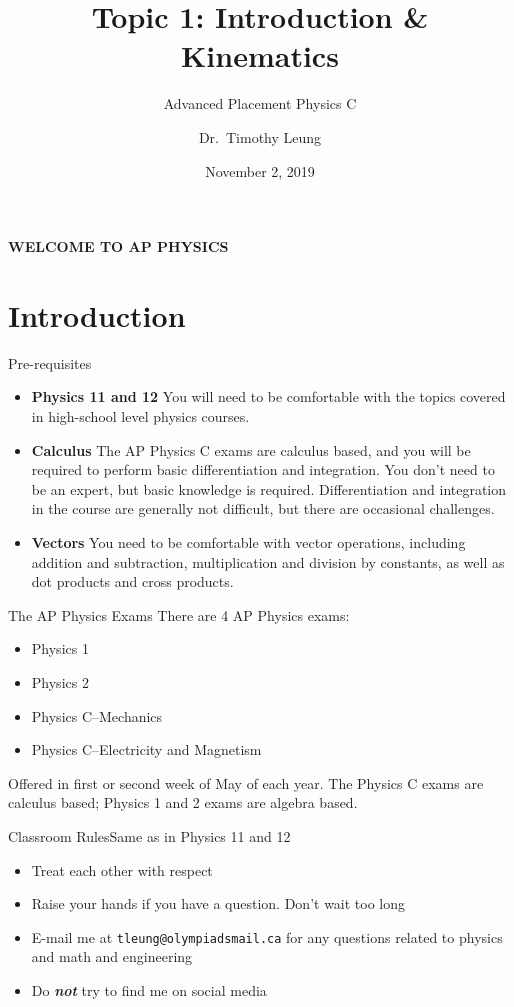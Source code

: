 \documentclass[12pt,compress,aspectratio=169]{beamer}
\title{Topic 1: Introduction \& Kinematics}
\subtitle{Advanced Placement Physics C}
\author[TML]{Dr.\ Timothy Leung}
\institute{Olympiads School}
\date{November 2, 2019}
\begin{document}
\begin{frame}{}

  {\LARGE
    \begin{center}
      \textbf{WELCOME TO AP PHYSICS}
    \end{center}
  }
\end{frame}


\section{Introduction}

\begin{frame}{Pre-requisites}
  \begin{itemize}
  \item\textbf{Physics 11 and 12} You will need to be comfortable with the
    topics covered in high-school level physics courses.
  \item\textbf{Calculus} The AP Physics C exams are calculus based, and you
    will be required to perform basic differentiation and integration. You
    don't need to be an expert, but basic knowledge is required.
    Differentiation and integration in the course are generally not
    difficult, but there are occasional challenges.
  \item\textbf{Vectors} You need to be comfortable with vector operations,
    including addition and subtraction, multiplication and division by
    constants, as well as dot products and cross products.
  \end{itemize}
\end{frame}



\begin{frame}{The AP Physics Exams}
  There are 4 AP Physics exams:
  \begin{itemize}
  \item Physics 1
  \item Physics 2
  \item Physics C--Mechanics
  \item Physics C--Electricity and Magnetism
  \end{itemize}
  Offered in first or second week of May of each year. The Physics C exams
  are calculus based; Physics 1 and 2 exams are algebra based.
\end{frame}



\begin{frame}{Classroom Rules}{Same as in Physics 11 and 12}
  \begin{itemize}
  \item Treat each other with respect
  \item Raise your hands if you have a question. Don't wait too long
  \item E-mail me at \texttt{tleung@olympiadsmail.ca} for any questions related
    to physics and math and engineering
  \item Do \textbf{\emph{not}} try to find me on social media
  \end{itemize}
\end{frame}
\end{document}

